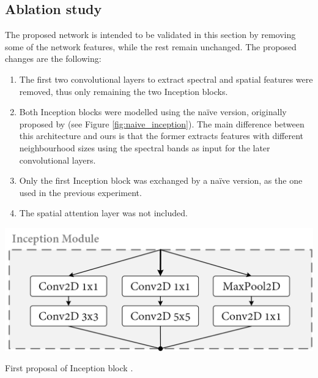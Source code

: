 \subsection{Ablation study}

The proposed network is intended to be validated in this section by removing some of the network features, while the rest remain unchanged. The proposed changes are the following:
\begin{enumerate}
    \item The first two convolutional layers to extract spectral and spatial features were removed, thus only remaining the two Inception blocks.
    \item Both Inception blocks were modelled using the naïve version, originally proposed by \cite{szegedy_going_2014} (see Figure \ref{fig:naive_inception}). The main difference between this architecture and ours is that the former extracts features with different neighbourhood sizes using the spectral bands as input for the later convolutional layers.
    \item Only the first Inception block was exchanged by a naïve version, as the one used in the previous experiment.
    \item The spatial attention layer was not included.
\end{enumerate}

\begin{marginfigure}[.cm]
    \centering
    \includegraphics[width=\linewidth]{figs/vineyard_classification/inception_block.png}
	\caption{First proposal of Inception block \cite{szegedy_going_2014}.}
	\label{fig:naive_inception}
\end{marginfigure}


